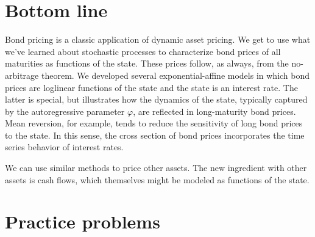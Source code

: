 \documentclass[11pt]{article}
\begin{document}
\section*{Bottom line}

Bond pricing is a classic application of dynamic asset pricing.
We get to use what we've learned about stochastic processes to characterize
bond prices of all maturities as functions of the state.
These prices follow, as always, from the no-arbitrage theorem.
We developed several exponential-affine models in which
bond prices  are loglinear functions of the state
and the state is an interest rate.
The latter is special, but illustrates how the dynamics of the state,
typically captured by the autoregressive parameter $\varphi$,
are reflected in long-maturity bond prices.
Mean reversion, for example, tends to reduce the sensitivity
of long bond prices to the state.
In this sense, the cross section of bond prices
incorporates the time series behavior of interest rates.

We can use similar methods to price other assets.
The new ingredient with other assets is cash flows,
which themselves might be modeled as functions of the state.


\section*{Practice problems}
\end{document}
